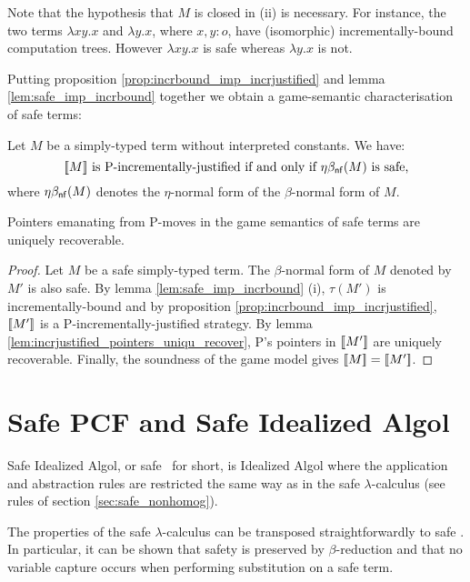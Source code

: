 Note that the hypothesis that $M$ is closed in (ii) is necessary.
For instance, the two terms $\lambda x y .x$ and $\lambda y . x$,
where $x,y:o$, have (isomorphic) incrementally-bound computation
trees. However $\lambda x y .x$ is safe whereas $\lambda y . x$ is
not.



Putting proposition \ref{prop:incrbound_imp_incrjustified} and lemma
\ref{lem:safe_imp_incrbound} together we obtain a game-semantic
characterisation of safe terms:
\begin{cor}
Let $M$ be a simply-typed term without interpreted constants. We have:
$$ {[\![ M ]\!]} \mbox{ is P-incrementally-justified if and only if $\eta\beta_{\sf nf}(M)$ is safe,} $$
where $\eta\beta_{\sf nf}(M)$ denotes the $\eta$-normal form of the
$\beta$-normal form of $M$.
\end{cor}



\begin{thm}
\label{thm:safe_ptr_recoverable} Pointers emanating from P-moves in the game semantics of
safe terms are uniquely recoverable.
\end{thm}
\begin{proof}
Let $M$ be a safe simply-typed term. The $\beta$-normal form of $M$
denoted by $M'$ is also safe. By lemma \ref{lem:safe_imp_incrbound}
(i), $\tau(M')$ is incrementally-bound and by proposition
\ref{prop:incrbound_imp_incrjustified}, ${[\![ M' ]\!]}$ is a
P-incrementally-justified strategy. By lemma
\ref{lem:incrjustified_pointers_uniqu_recover}, P's pointers in
${[\![ M' ]\!]}$ are uniquely recoverable. Finally, the soundness of the
game model gives ${[\![ M ]\!]} = {[\![ M' ]\!]}$.
\end{proof}


\section{Safe PCF and Safe Idealized Algol}

Safe Idealized Algol, or safe \ialgol\ for short, is Idealized Algol
where the application and abstraction rules are restricted the same
way as in the safe $\lambda$-calculus (see rules of section
\ref{sec:safe_nonhomog}).

The properties of the safe $\lambda$-calculus can be transposed
straightforwardly to safe \ialgol. In particular, it can be shown
that safety is preserved by $\beta$-reduction and that no variable
capture occurs when performing substitution on a safe term.


